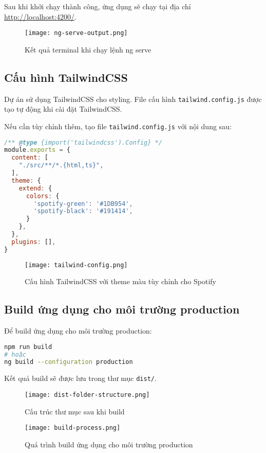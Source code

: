 \documentclass[12pt,a4paper]{article}
\begin{document}
Sau khi khởi chạy thành công, ứng dụng sẽ chạy tại địa chỉ \url{http://localhost:4200/}.

\begin{figure}[h]
\centering
\texttt{[image: ng-serve-output.png]}
\caption{Kết quả terminal khi chạy lệnh ng serve}
\end{figure}

\subsection{Cấu hình TailwindCSS}

Dự án sử dụng TailwindCSS cho styling. File cấu hình \texttt{tailwind.config.js} được tạo tự động khi cài đặt TailwindCSS.

Nếu cần tùy chỉnh thêm, tạo file \texttt{tailwind.config.js} với nội dung sau:

\begin{lstlisting}[language=javascript]
/** @type {import('tailwindcss').Config} */
module.exports = {
  content: [
    "./src/**/*.{html,ts}",
  ],
  theme: {
    extend: {
      colors: {
        'spotify-green': '#1DB954',
        'spotify-black': '#191414',
      }
    },
  },
  plugins: [],
}
\end{lstlisting}

\begin{figure}[h]
\centering
\texttt{[image: tailwind-config.png]}
\caption{Cấu hình TailwindCSS với theme màu tùy chỉnh cho Spotify}
\end{figure}

\subsection{Build ứng dụng cho môi trường production}

Để build ứng dụng cho môi trường production:

\begin{lstlisting}[language=bash]
npm run build
# hoặc
ng build --configuration production
\end{lstlisting}

Kết quả build sẽ được lưu trong thư mục \texttt{dist/}.

\begin{figure}[h]
\centering
\texttt{[image: dist-folder-structure.png]}
\caption{Cấu trúc thư mục sau khi build}
\end{figure}

\begin{figure}[h]
\centering
\texttt{[image: build-process.png]}
\caption{Quá trình build ứng dụng cho môi trường production}
\end{figure}
\end{document}
